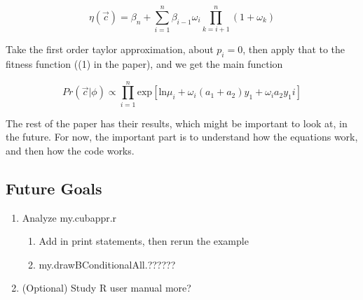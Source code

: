 \documentclass[11pt]{article} %
\begin{document}
$$\eta(\vec{c}) =
\beta_{n} +
\sum_{i=1}^{n}
\beta_{i-1}
\omega_i
\prod_{k=i+1}^{n}(1 + \omega_k)
$$


Take the first order taylor approximation, about $p_i=0$, then apply that to the fitness function ((1) in the paper), and we get the main function

$$Pr(\vec{c} | \phi)
\propto
\prod_{i=1}^{n}
\text{exp}[ \text{ln} \mu_i +
\omega_i(a_1 + a_2)y_1 +
\omega_i a_2 y_1 i]$$


The rest of the paper has their results, which might be important to look at, in the future. For now, the important part is to understand how the equations work, and then how the code works.


\subsection{Future Goals}
\begin{enumerate}
\item Analyze my.cubappr.r
\begin{enumerate}
\item Add in print statements, then rerun the example
\item my.drawBConditionalAll.??????
\end{enumerate}

\item (Optional) Study R user manual more?
\end{enumerate}


\end{document}

